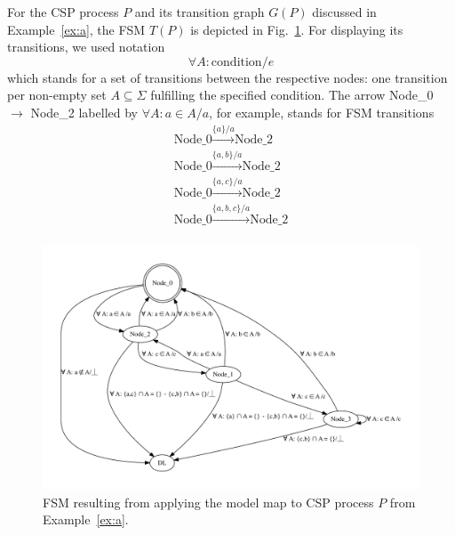 \begin{example}\label{ex:b}
For the CSP process $P$ and its transition graph $G(P)$ discussed in Example~\ref{ex:a}, the FSM $T(P)$ is depicted in Fig.~\ref{fig:fsm0}. 
For displaying its transitions, we used notation
$$
\forall A: \text{condition} / e
$$
which stands for a set of transitions between the respective nodes: one transition per non-empty set $A\subseteq \Sigma$ fulfilling the specified condition.
The arrow Node\_0 $\longrightarrow$ Node\_2 labelled by $\forall A: a\in A / a$, 
for example, stands for FSM transitions
$$
\begin{array}{l}
\text{Node\_0} \xrightarrow{\{a\}/a} \text{Node\_2} \\
\text{Node\_0} \xrightarrow{\{a,b\}/a} \text{Node\_2} \\
\text{Node\_0} \xrightarrow{\{a,c\}/a} \text{Node\_2} \\
\text{Node\_0} \xrightarrow{\{a,b,c\}/a} \text{Node\_2} \\
\end{array}
$$
\xbox
\end{example}


 \begin{figure}
 \begin{center}
\includegraphics[width=\textwidth]{fsm0.pdf}
\end{center}
\caption{FSM resulting from applying the model map to CSP process $P$ from Example~\ref{ex:a}.}
 \label{fig:fsm0}
 \end{figure}


